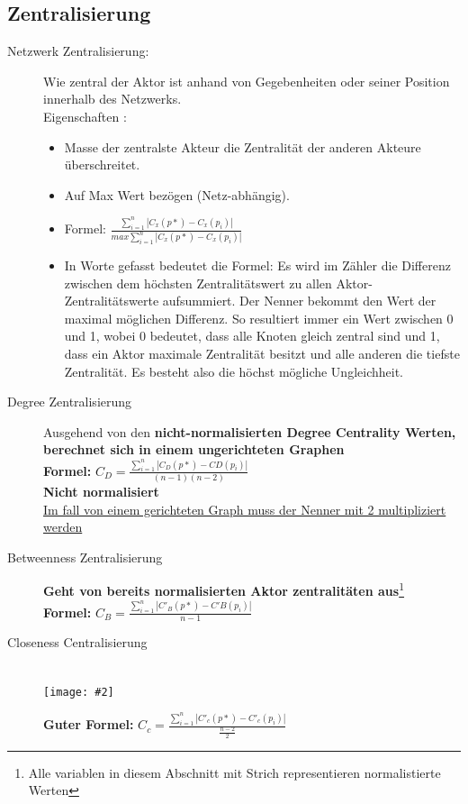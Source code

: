 \documentclass[a4paper,landscape,12pt]{scrreprt}
\newenvironment{Figure}
  {\noindent\minipage{\linewidth}}
  {\endminipage}
\newcommand{\pic}[2][ ]{
\begin{Figure}
 \texttt{[image: \#2]}
 \captionof{figure}{#1}
\end{Figure}
}
\newcommand{\dsp}{
\hfill \\
}
\begin{document}
\begin{multicols*}{2}
\section{Zentralisierung} %
\label{sec:zentralisierung}
\begin{description}
	\item[Netzwerk Zentralisierung:]  Wie zentral der Aktor ist anhand von Gegebenheiten oder seiner Position innerhalb des Netzwerks.\\
	Eigenschaften : 
	\begin{itemize}
		\item Masse der zentralste Akteur die Zentralität der anderen Akteure überschreitet.
		\item Auf Max Wert bezögen (Netz-abhängig).
		\item Formel: $\frac{\sum^n_{i=1} |C_x(p*)-C_x(p_i)|}{max \sum^{n}_{i=1} 
|C_x(p*)-C_x(p_i)|}$
\item In Worte gefasst bedeutet die Formel: Es wird im Zähler die Differenz zwischen dem höchsten
Zentralitätswert zu allen Aktor-Zentralitätswerte aufsummiert. Der Nenner bekommt den Wert der
maximal möglichen Differenz. So resultiert immer ein Wert zwischen 0 und 1, wobei 0 bedeutet, dass
alle Knoten gleich zentral sind und 1, dass ein Aktor maximale Zentralität besitzt und alle anderen die
tiefste Zentralität. Es besteht also die höchst mögliche Ungleichheit.
	\end{itemize}
	\item[Degree Zentralisierung] Ausgehend von den \textbf{nicht-normalisierten Degree Centrality Werten, berechnet sich in einem ungerichteten Graphen}\\
	\textbf{Formel:} $C_D = \frac{\sum_{i=1}^n |C_D(p*)-CD(p_i)|}{(n-1)(n-2)}$\\
	\textbf{Nicht normalisiert} \\
	\underline{Im fall von einem gerichteten Graph muss der Nenner mit 2 multipliziert werden}
	\item[Betweenness Zentralisierung] \textbf{Geht von bereits normalisierten Aktor zentralitäten aus}\footnote{Alle variablen in diesem Abschnitt mit Strich representieren normalistierte Werten}\\
	\textbf{Formel:} $C_B = \frac{\sum^n_{i=1} |C'_B(p*)-C'B(p_i)|}{n-1}$
	\item[Closeness Centralisierung] \dsp
	\pic{img/nformel.png}
	\textbf{Guter Formel:} $C_c = \frac{\sum_{i=1}^n |C'_c(p*)-C'_c(p_i)|}{\frac{n-2}{2}}$
\end{description}

\end{multicols*}
\end{document}
